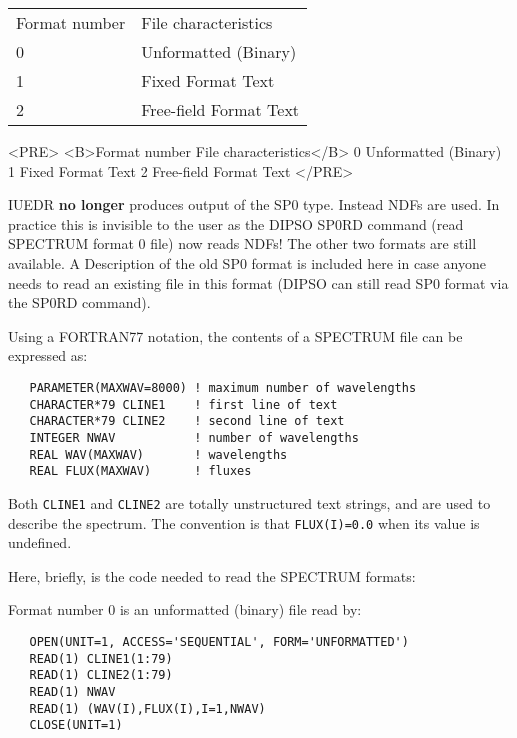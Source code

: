\begin{latexonly}
\begin{tabular}{ll}
Format number & File characteristics\\
0             & Unformatted (Binary)\\
1             & Fixed Format Text\\
2             & Free-field Format Text\\
\end{tabular}
\end{latexonly}

\begin{htmlonly}
\begin{rawhtml}
<PRE>
<B>Format number     File characteristics</B>
      0           Unformatted (Binary)
      1           Fixed Format Text
      2           Free-field Format Text
</PRE>
\end{rawhtml}
\end{htmlonly}

IUEDR {\bf no longer} produces output of the SP0 type.  Instead NDFs are used.
In practice this is invisible to the user as the DIPSO SP0RD command (read
SPECTRUM format 0 file) now reads NDFs!  The other two formats are still
available.  A Description of the old SP0 format is included here in case
anyone needs to read an existing file in this format (DIPSO can still read
SP0 format via the SP0RD command)\@.

Using a FORTRAN77 notation, the contents of a SPECTRUM file can be
expressed as:

\begin{verbatim}
   PARAMETER(MAXWAV=8000) ! maximum number of wavelengths
   CHARACTER*79 CLINE1    ! first line of text
   CHARACTER*79 CLINE2    ! second line of text
   INTEGER NWAV           ! number of wavelengths
   REAL WAV(MAXWAV)       ! wavelengths
   REAL FLUX(MAXWAV)      ! fluxes
\end{verbatim}

Both \verb+CLINE1+ and \verb+CLINE2+ are totally unstructured text strings,
and are used to describe the spectrum.  The convention is that
\verb+FLUX(I)=0.0+ when its value is undefined.

Here, briefly, is the code needed to read the SPECTRUM formats:

Format number 0 is an unformatted (binary) file read by:

\begin{verbatim}
   OPEN(UNIT=1, ACCESS='SEQUENTIAL', FORM='UNFORMATTED')
   READ(1) CLINE1(1:79)
   READ(1) CLINE2(1:79)
   READ(1) NWAV
   READ(1) (WAV(I),FLUX(I),I=1,NWAV)
   CLOSE(UNIT=1)
\end{verbatim}

